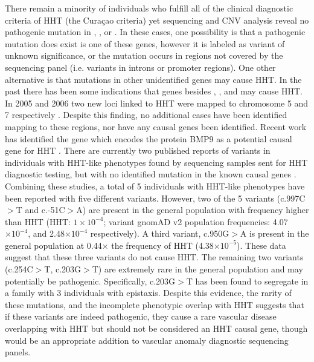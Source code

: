 There remain a minority of individuals who fulfill all of the clinical diagnostic criteria of HHT (the Cura\c{c}ao criteria) yet sequencing and CNV analysis reveal no pathogenic mutation in , , or . In these cases, one possibility is that a pathogenic mutation does exist is one of these genes, however it is labeled as variant of unknown significance, or the mutation occurs in regions not covered by the sequencing panel (i.e. variants in introns or promoter regions). One other alternative is that mutations in other unidentified genes may cause HHT. In the past there has been some indications that genes besides , , and  may cause HHT. In 2005 and 2006 two new loci linked to HHT were mapped to chromosome 5 and 7 respectively \citep{cole2005, bayraktoydemir2006}. Despite this finding, no additional cases have been identified mapping to these regions, nor have any causal genes been identified. Recent work has identified the gene  which encodes the protein BMP9 as a potential causal gene for HHT \citep{wooderchakdonahue2013}. There are currently two published reports of  variants in individuals with HHT-like phenotypes found by sequencing samples sent for HHT diagnostic testing, but with no identified mutation in the known causal genes \citep{wooderchakdonahue2013, hernandez2015}. Combining these studies, a total of 5 individuals with HHT-like phenotypes have been reported with five different  variants. However, two of the 5 variants (c.997C$>$T and c.-51C$>$A) are present in the general population with frequency higher than HHT (HHT: $1\times 10^{-4}$; variant gnomAD v2 population frequencies: 4.07$\times 10^{-4}$, and 2.48$\times 10^{-4}$ respectively). A third variant, c.950G$>$A is present in the general population at 0.44$\times$ the frequency of HHT (4.38$\times 10^{-5}$). These data suggest that these three variants do not cause HHT. The remaining two variants (c.254C$>$T, c.203G$>$T) are extremely rare in the general population and may potentially be pathogenic. Specifically, c.203G$>$T has been found to segregate in a family with 3 individuals with epistaxis. Despite this evidence, the rarity of these mutations, and the incomplete phenotypic overlap with HHT suggests that if these variants are indeed pathogenic, they cause a rare vascular disease overlapping with HHT but should not be considered an HHT causal gene, though  would be an appropriate addition to vascular anomaly diagnostic sequencing panels. 

